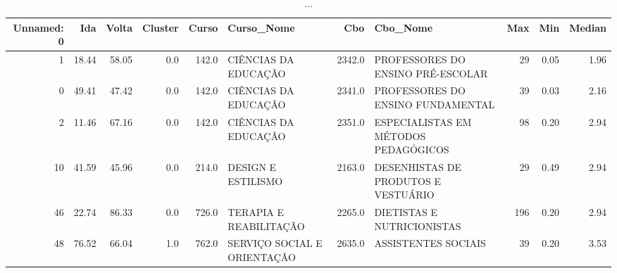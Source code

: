 \begin{table}
\centering
\caption{...}
\label{tab:Salarios_Desequlibrio_M}
\begin{tabular}{rrrrrlrlrrr}
\toprule
 Unnamed: 0 &   Ida &  Volta &  Cluster &  Curso &                  Curso\_Nome &    Cbo &                             Cbo\_Nome &  Max &  Min &  Median \\
\midrule
          1 & 18.44 &  58.05 &      0.0 &  142.0 &        CIÊNCIAS DA EDUCAÇÃO & 2342.0 &    PROFESSORES DO ENSINO PRÉ-ESCOLAR &   29 & 0.05 &    1.96 \\
          0 & 49.41 &  47.42 &      0.0 &  142.0 &        CIÊNCIAS DA EDUCAÇÃO & 2341.0 &    PROFESSORES DO ENSINO FUNDAMENTAL &   39 & 0.03 &    2.16 \\
          2 & 11.46 &  67.16 &      0.0 &  142.0 &        CIÊNCIAS DA EDUCAÇÃO & 2351.0 & ESPECIALISTAS EM MÉTODOS PEDAGÓGICOS &   98 & 0.20 &    2.94 \\
         10 & 41.59 &  45.96 &      0.0 &  214.0 &          DESIGN E ESTILISMO & 2163.0 & DESENHISTAS DE PRODUTOS E  VESTUÁRIO &   29 & 0.49 &    2.94 \\
         46 & 22.74 &  86.33 &      0.0 &  726.0 &      TERAPIA E REABILITAÇÃO & 2265.0 &           DIETISTAS E NUTRICIONISTAS &  196 & 0.20 &    2.94 \\
         48 & 76.52 &  66.04 &      1.0 &  762.0 & SERVIÇO SOCIAL E ORIENTAÇÃO & 2635.0 &                  ASSISTENTES SOCIAIS &   39 & 0.20 &    3.53 \\
\bottomrule
\end{tabular}
\end{table}
